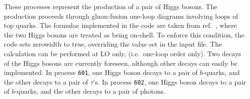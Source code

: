 These processes represent the production of a pair of Higgs bosons.
The production proceeds through gluon-fusion one-loop diagrams involving loops
of top quarks. The formulae implemented in the code are taken from ref.~\cite{Glover:1987nx},
where the two Higgs bosons are treated as being on-shell. To enforce this
condition, the code sets zerowidth to true, overriding the value set in the input file.
The calculation can be performed at LO only, (i.e.\ one-loop order only).
Two decays of the Higgs bosons are currently foreseen, although other decays can easily be implemented.
In process {\tt 601}, one Higgs boson decays to
a pair of $b$-quarks, and the other decays to a pair of $\tau$'s.
In process {\tt 602}, one Higgs boson decays to
a pair of $b$-quarks, and the other decays to a pair of photons.
